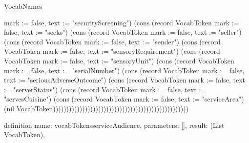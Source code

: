 \begin{lexlean}{VocabNames}
\begin{semanticmodule}
{{mark := false, text := "securityScreening"}) (cons (record VocabToken {mark := false, text := "seeks"}) (cons (record VocabToken {mark := false, text := "seller"}) (cons (record VocabToken {mark := false, text := "sender"}) (cons (record VocabToken {mark := false, text := "sensoryRequirement"}) (cons (record VocabToken {mark := false, text := "sensoryUnit"}) (cons (record VocabToken {mark := false, text := "serialNumber"}) (cons (record VocabToken {mark := false, text := "seriousAdverseOutcome"}) (cons (record VocabToken {mark := false, text := "serverStatus"}) (cons (record VocabToken {mark := false, text := "servesCuisine"}) (cons (record VocabToken {mark := false, text := "serviceArea"}) (nil VocabToken)))))))))))))))))))))))))))))))))))))))))))))))))))
}

definition{
  name: vocabTokensserviceAudience,
  parameters: [],
  result: (List VocabToken),
}
\end{semanticmodule}
\end{lexlean}
